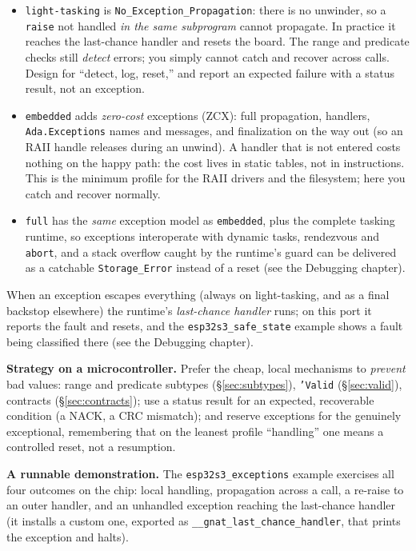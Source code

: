 \begin{itemize}
  \item \texttt{light-tasking} is \texttt{No\_Exception\_Propagation}: there is no
        unwinder, so a \texttt{raise} not handled \emph{in the same subprogram}
        cannot propagate. In practice it reaches the last-chance handler and
        resets the board. The range and predicate checks still \emph{detect}
        errors; you simply cannot catch and recover across calls. Design for
        ``detect, log, reset,'' and report an expected failure with a status
        result, not an exception.
  \item \texttt{embedded} adds \emph{zero-cost} exceptions (ZCX): full propagation,
        handlers, \texttt{Ada.Exceptions} names and messages, and finalization on
        the way out (so an RAII handle releases during an unwind). A handler that
        is not entered costs nothing on the happy path: the cost lives in static
        tables, not in instructions. This is the minimum profile for the RAII
        drivers and the filesystem; here you catch and recover normally.
  \item \texttt{full} has the \emph{same} exception model as \texttt{embedded},
        plus the complete tasking runtime, so exceptions interoperate with dynamic
        tasks, rendezvous and \texttt{abort}, and a stack overflow caught by the
        runtime's guard can be delivered as a catchable \texttt{Storage\_Error}
        instead of a reset (see the Debugging chapter).
\end{itemize}

When an exception escapes everything (always on light-tasking, and as a final
backstop elsewhere) the runtime's \emph{last-chance handler} runs; on this port
it reports the fault and resets, and the \texttt{esp32s3\_safe\_state} example
shows a fault being classified there (see the Debugging chapter).

\textbf{Strategy on a microcontroller.} Prefer the cheap, local mechanisms to
\emph{prevent} bad values: range and predicate subtypes (\S\ref{sec:subtypes}),
\texttt{'Valid} (\S\ref{sec:valid}), contracts (\S\ref{sec:contracts}); use a
status result for an expected, recoverable condition (a NACK, a CRC mismatch); and
reserve exceptions for the genuinely exceptional, remembering that on the leanest
profile ``handling'' one means a controlled reset, not a resumption.

\textbf{A runnable demonstration.} The \texttt{esp32s3\_exceptions} example
exercises all four outcomes on the chip: local handling, propagation across a
call, a re-raise to an outer handler, and an unhandled exception reaching the
last-chance handler (it installs a custom one, exported as
\texttt{\_\_gnat\_last\_chance\_handler}, that prints the exception and halts).

